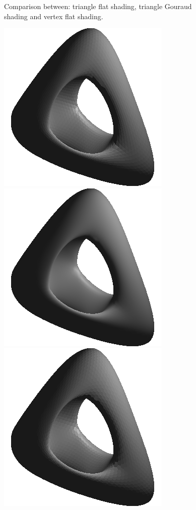 \begin{figure}[!h]
    \endminipage
    \caption{Comparison between: triangle flat shading, triangle Gouraud shading and vertex flat shading.}
    \label{fig:comparison-icosahedron}
\end{figure}

\begin{figure}[!h]
    \centering
    \centering
    \includegraphics[scale=0.6]{images/genus-fs.png}
    \endminipage\hfill
    \centering
    \centering
    \includegraphics[scale=0.6]{images/genus-gs.png}
    \endminipage\hfill
    \centering
    \includegraphics[scale=0.6]{images/genus-efs.png}

\end{figure}

